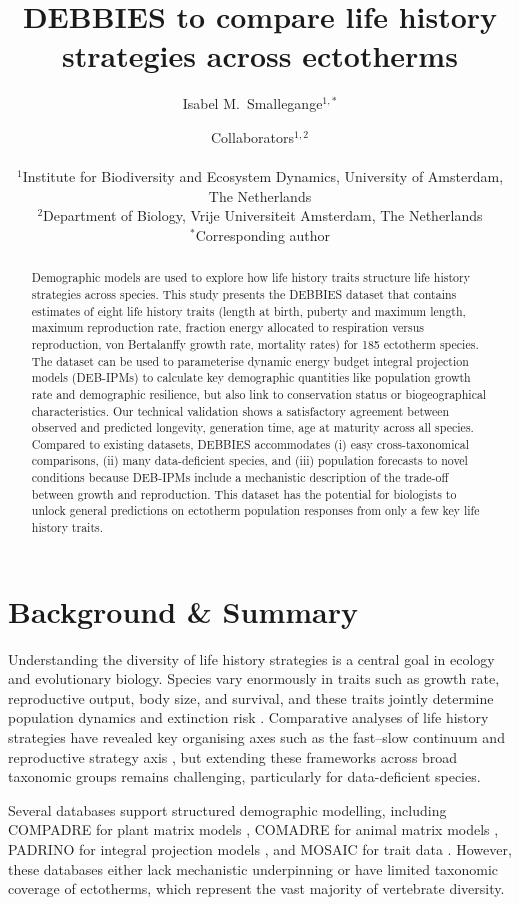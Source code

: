 \documentclass[11pt]{article}
\title{DEBBIES to compare life history strategies across ectotherms}
\author{
Isabel M.\ Smallegange$^{1,*}$ \and Collaborators$^{1,2}$\\
\\
\small $^{1}$Institute for Biodiversity and Ecosystem Dynamics, University of Amsterdam, The Netherlands\\
\small $^{2}$Department of Biology, Vrije Universiteit Amsterdam, The Netherlands\\
\small $^{*}$Corresponding author
}
\date{}
\begin{document}
\maketitle

\begin{abstract}
Demographic models are used to explore how life history traits structure life history strategies across species. This study presents the DEBBIES dataset that contains estimates of eight life history traits (length at birth, puberty and maximum length, maximum reproduction rate, fraction energy allocated to respiration versus reproduction, von Bertalanffy growth rate, mortality rates) for 185 ectotherm species. The dataset can be used to parameterise dynamic energy budget integral projection models (DEB-IPMs) to calculate key demographic quantities like population growth rate and demographic resilience, but also link to conservation status or biogeographical characteristics. Our technical validation shows a satisfactory agreement between observed and predicted longevity, generation time, age at maturity across all species. Compared to existing datasets, DEBBIES accommodates (i) easy cross-taxonomical comparisons, (ii) many data-deficient species, and (iii) population forecasts to novel conditions because DEB-IPMs include a mechanistic description of the trade-off between growth and reproduction. This dataset has the potential for biologists to unlock general predictions on ectotherm population responses from only a few key life history traits.
\end{abstract}

\section{Background \& Summary}

Understanding the diversity of life history strategies is a central goal in ecology and evolutionary biology. Species vary enormously in traits such as growth rate, reproductive output, body size, and survival, and these traits jointly determine population dynamics and extinction risk \citep{salguero2016,paniw2018,healy2020}. Comparative analyses of life history strategies have revealed key organising axes such as the fast--slow continuum \citep{salguero2017} and reproductive strategy axis \citep{salguero2016}, but extending these frameworks across broad taxonomic groups remains challenging, particularly for data-deficient species.

Several databases support structured demographic modelling, including COMPADRE for plant matrix models \citep{salguero2015}, COMADRE for animal matrix models \citep{salguero2016b}, PADRINO for integral projection models \citep{jongejans2022}, and MOSAIC for trait data \citep{pottier2023}. However, these databases either lack mechanistic underpinning or have limited taxonomic coverage of ectotherms, which represent the vast majority of vertebrate diversity.
\end{document}
